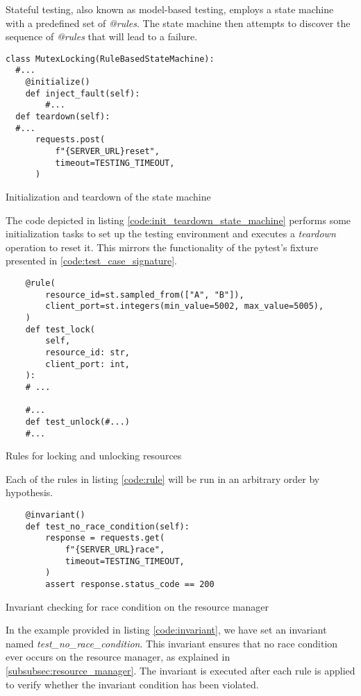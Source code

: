 Stateful testing, also known as model-based testing, employs a state machine with a predefined set of \textit{@rules}. The state machine then attempts to discover the sequence of \textit{@rules} that will lead to a failure.

\begin{listing}[!ht]
  \begin{verbatim}
class MutexLocking(RuleBasedStateMachine):
  #... 
    @initialize()
    def inject_fault(self):
        #...
  def teardown(self):
  #...
      requests.post(
          f"{SERVER_URL}reset",
          timeout=TESTING_TIMEOUT,
      )
 \end{verbatim}
 \caption{Initialization and teardown of the state machine}
 \label{code:init_teardown_state_machine}
\end{listing}

The code depicted in listing \ref{code:init_teardown_state_machine} performs some initialization tasks to set up the testing environment and executes a \textit{teardown} operation to reset it. This mirrors the functionality of the pytest's fixture presented in \ref{code:test_case_signature}.

\begin{listing}[!ht]
  \begin{verbatim}
    @rule(
        resource_id=st.sampled_from(["A", "B"]),
        client_port=st.integers(min_value=5002, max_value=5005),
    )
    def test_lock(
        self,
        resource_id: str,
        client_port: int,
    ):
    # ...

    #... 
    def test_unlock(#...)
    #... 
  \end{verbatim}
  \caption{Rules for locking and unlocking resources}
  \label{code:rule}
\end{listing}

Each of the rules in listing \ref{code:rule} will be run in an arbitrary order by hypothesis.

\begin{listing}[!ht]
  \begin{verbatim}
    @invariant()
    def test_no_race_condition(self):
        response = requests.get(
            f"{SERVER_URL}race",
            timeout=TESTING_TIMEOUT,
        )
        assert response.status_code == 200
  \end{verbatim}
  \caption{Invariant checking for race condition on the resource manager}
  \label{code:invariant}
\end{listing}

In the example provided in listing \ref{code:invariant}, we have set an invariant named \textit{test\_no\_race\_condition}. This invariant ensures that no race condition ever occurs on the resource manager, as explained in \ref{subsubsec:resource_manager}. The invariant is executed after each rule is applied to verify whether the invariant condition has been violated.

